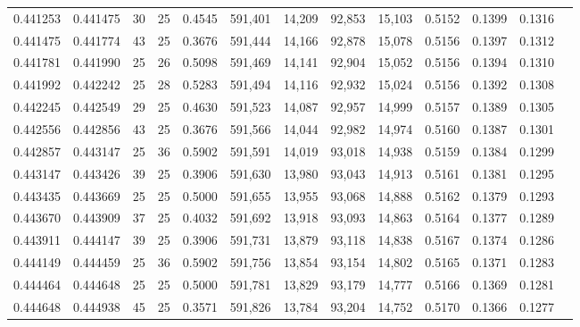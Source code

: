\begin{tabular}{rrrrrrrrrrrrr}
0.441253 & 0.441475 &    30 &  25 &                                     0.4545 & 591,401 &  14,209 &  92,853 &  15,103 & 0.5152 & 0.1399 & 0.1316 \\
0.441475 & 0.441774 &    43 &  25 &                                     0.3676 & 591,444 &  14,166 &  92,878 &  15,078 & 0.5156 & 0.1397 & 0.1312 \\
0.441781 & 0.441990 &    25 &  26 &                                     0.5098 & 591,469 &  14,141 &  92,904 &  15,052 & 0.5156 & 0.1394 & 0.1310 \\
0.441992 & 0.442242 &    25 &  28 &                                     0.5283 & 591,494 &  14,116 &  92,932 &  15,024 & 0.5156 & 0.1392 & 0.1308 \\
0.442245 & 0.442549 &    29 &  25 &                                     0.4630 & 591,523 &  14,087 &  92,957 &  14,999 & 0.5157 & 0.1389 & 0.1305 \\
0.442556 & 0.442856 &    43 &  25 &                                     0.3676 & 591,566 &  14,044 &  92,982 &  14,974 & 0.5160 & 0.1387 & 0.1301 \\
0.442857 & 0.443147 &    25 &  36 &                                     0.5902 & 591,591 &  14,019 &  93,018 &  14,938 & 0.5159 & 0.1384 & 0.1299 \\
0.443147 & 0.443426 &    39 &  25 &                                     0.3906 & 591,630 &  13,980 &  93,043 &  14,913 & 0.5161 & 0.1381 & 0.1295 \\
0.443435 & 0.443669 &    25 &  25 &                                     0.5000 & 591,655 &  13,955 &  93,068 &  14,888 & 0.5162 & 0.1379 & 0.1293 \\
0.443670 & 0.443909 &    37 &  25 &                                     0.4032 & 591,692 &  13,918 &  93,093 &  14,863 & 0.5164 & 0.1377 & 0.1289 \\
0.443911 & 0.444147 &    39 &  25 &                                     0.3906 & 591,731 &  13,879 &  93,118 &  14,838 & 0.5167 & 0.1374 & 0.1286 \\
0.444149 & 0.444459 &    25 &  36 &                                     0.5902 & 591,756 &  13,854 &  93,154 &  14,802 & 0.5165 & 0.1371 & 0.1283 \\
0.444464 & 0.444648 &    25 &  25 &                                     0.5000 & 591,781 &  13,829 &  93,179 &  14,777 & 0.5166 & 0.1369 & 0.1281 \\
0.444648 & 0.444938 &    45 &  25 &                                     0.3571 & 591,826 &  13,784 &  93,204 &  14,752 & 0.5170 & 0.1366 & 0.1277 \\

\end{tabular}
